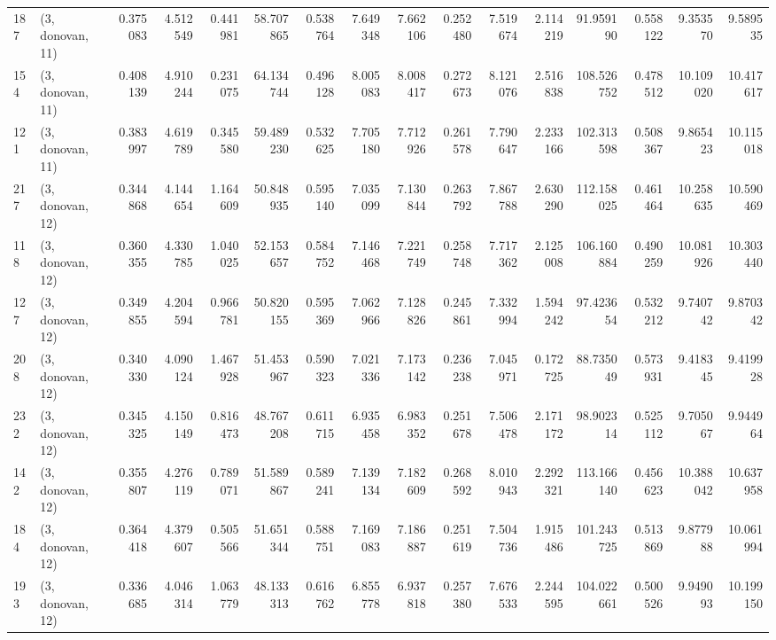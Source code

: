 \begin{tabular}{llrrrrrrrrrrrrrr}
187 &  (3, donovan, 11) &   0.375083 &   4.512549 &  0.441981 &   58.707865 &  0.538764 &   7.649348 &   7.662106 &  0.252480 &   7.519674 &   2.114219 &   91.959190 &  0.558122 &   9.353570 &   9.589535 \\
154 &  (3, donovan, 11) &   0.408139 &   4.910244 &  0.231075 &   64.134744 &  0.496128 &   8.005083 &   8.008417 &  0.272673 &   8.121076 &   2.516838 &  108.526752 &  0.478512 &  10.109020 &  10.417617 \\
121 &  (3, donovan, 11) &   0.383997 &   4.619789 &  0.345580 &   59.489230 &  0.532625 &   7.705180 &   7.712926 &  0.261578 &   7.790647 &   2.233166 &  102.313598 &  0.508367 &   9.865423 &  10.115018 \\
217 &  (3, donovan, 12) &   0.344868 &   4.144654 &  1.164609 &   50.848935 &  0.595140 &   7.035099 &   7.130844 &  0.263792 &   7.867788 &   2.630290 &  112.158025 &  0.461464 &  10.258635 &  10.590469 \\
118 &  (3, donovan, 12) &   0.360355 &   4.330785 &  1.040025 &   52.153657 &  0.584752 &   7.146468 &   7.221749 &  0.258748 &   7.717362 &   2.125008 &  106.160884 &  0.490259 &  10.081926 &  10.303440 \\
127 &  (3, donovan, 12) &   0.349855 &   4.204594 &  0.966781 &   50.820155 &  0.595369 &   7.062966 &   7.128826 &  0.245861 &   7.332994 &   1.594242 &   97.423654 &  0.532212 &   9.740742 &   9.870342 \\
208 &  (3, donovan, 12) &   0.340330 &   4.090124 &  1.467928 &   51.453967 &  0.590323 &   7.021336 &   7.173142 &  0.236238 &   7.045971 &   0.172725 &   88.735049 &  0.573931 &   9.418345 &   9.419928 \\
232 &  (3, donovan, 12) &   0.345325 &   4.150149 &  0.816473 &   48.767208 &  0.611715 &   6.935458 &   6.983352 &  0.251678 &   7.506478 &   2.171172 &   98.902314 &  0.525112 &   9.705067 &   9.944964 \\
142 &  (3, donovan, 12) &   0.355807 &   4.276119 &  0.789071 &   51.589867 &  0.589241 &   7.139134 &   7.182609 &  0.268592 &   8.010943 &   2.292321 &  113.166140 &  0.456623 &  10.388042 &  10.637958 \\
184 &  (3, donovan, 12) &   0.364418 &   4.379607 &  0.505566 &   51.651344 &  0.588751 &   7.169083 &   7.186887 &  0.251619 &   7.504736 &   1.915486 &  101.243725 &  0.513869 &   9.877988 &  10.061994 \\
193 &  (3, donovan, 12) &   0.336685 &   4.046314 &  1.063779 &   48.133313 &  0.616762 &   6.855778 &   6.937818 &  0.257380 &   7.676533 &   2.244595 &  104.022661 &  0.500526 &   9.949093 &  10.199150 \\

\end{tabular}
